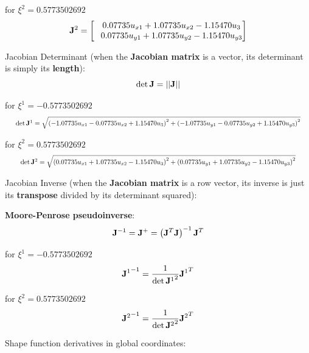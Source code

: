 for $ \xi^2 = 0.5773502692 $
\begin{equation}
    \mathbf{J}^2 = \begin{bmatrix}
        \phantom{-}0.07735 u_{x1} + 1.07735 u_{x2} - 1.15470 u_{3} \\
        \phantom{-}0.07735 u_{y1} + 1.07735 u_{y2} - 1.15470 u_{y3} \\
    \end{bmatrix}
\end{equation}


Jacobian Determinant (when the \textbf{Jacobian matrix} is a vector, its
determinant is simply its \textbf{length}):
\begin{equation}
    \det \mathbf{J} = || \mathbf{J} ||
\end{equation}

for $ \xi^1 = -0.5773502692 $
\begin{equation}
    \scalebox{0.78}{
        $ \det\m{J}^1 =
        \sqrt{ \left( -1.07735 u_{x1} -0.07735 u_{x2} + 1.15470 u_{3} \right)^2 +
            \left(-1.07735 u_{y1} -0.07735 u_{y2} + 1.15470 u_{y3} \right)^2 } $
    }
\end{equation}

for $ \xi^2 = 0.5773502692 $
\begin{equation}
    \scalebox{0.78}{
        $ \det\m{J}^2 =
        \sqrt{ \left(0.07735 u_{x1} + 1.07735 u_{x2} - 1.15470 u_{3} \right)^2 +
        \left(0.07735 u_{y1} + 1.07735 u_{y2} - 1.15470 u_{y3} \right)^2} $
    }
\end{equation}

Jacobian Inverse (when the \textbf{Jacobian matrix} is a row vector, its inverse
is just its \textbf{transpose} divided by its determinant squared):

\textbf{Moore-Penrose pseudoinverse}:
\begin{equation}
    \mathbf{J}^{-1} =
    \mathbf{J}^{+} = \left( \mathbf{J}^T \mathbf{J} \right)^{-1} \mathbf{J}^T
\end{equation}

for $ \xi^1 = -0.5773502692 $
\begin{equation}
    {\mathbf{J}^1}^{-1} = \frac{1}{{\det \mathbf{J}^1}^2} {\mathbf{J}^1}^T
\end{equation}

for $ \xi^2 = 0.5773502692 $
\begin{equation}
    {\mathbf{J}^2}^{-1} = \frac{1}{{\det \mathbf{J}^2}^2} {\mathbf{J}^2}^T
\end{equation}

Shape function derivatives in global coordinates:

